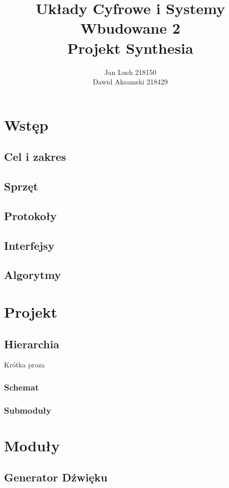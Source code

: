 \documentclass[a4paper]{report}
\title{\huge Układy Cyfrowe i Systemy Wbudowane 2\\Projekt Synthesia}
\date{} %
\author{Jan Luch\hspace{42pt} 218150  \\Dawid Aksamski\hspace{5pt} 218429}
\begin{document}
\frenchspacing
{}
\maketitle
\newpage

\tableofcontents
\newpage


\chapter{Wstęp}
	\section{Cel i zakres}
	\section{Sprzęt}
	\section{Protokoły}
	\section{Interfejsy}
	\section{Algorytmy}

\chapter{Projekt}
	\section{Hierarchia}
	Krótka proza
		\subsection{Schemat}
		\subsection{Submoduły}

\chapter{Moduły}
	\section{Generator Dźwięku}
\end{document}

